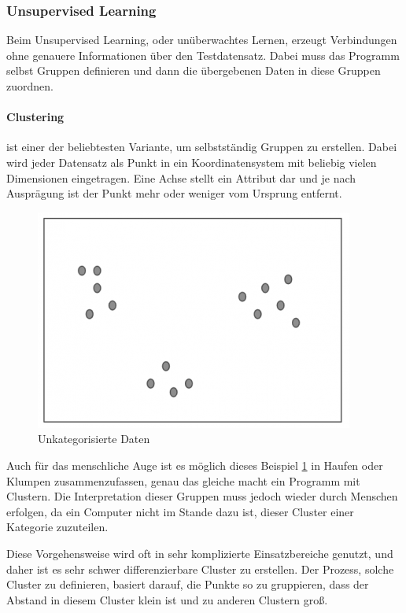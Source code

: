 \subsubsection{Unsupervised Learning}

Beim Unsupervised Learning, oder unüberwachtes Lernen, erzeugt Verbindungen ohne genauere Informationen über den Testdatensatz. Dabei muss das Programm selbst Gruppen definieren und dann die übergebenen Daten in diese Gruppen zuordnen. \cite{SL:online}

\paragraph{Clustering} ist einer der beliebtesten Variante, um selbstständig Gruppen zu erstellen. Dabei wird jeder Datensatz als Punkt in ein Koordinatensystem mit beliebig vielen Dimensionen eingetragen. Eine Achse stellt ein Attribut dar und je nach Ausprägung ist der Punkt mehr oder weniger vom Ursprung entfernt.

\begin{figure}[ht]
    \centering
    \includegraphics[scale=0.8]{sections/machine-learning/images/unclustered-data.png}
    \caption{Unkategorisierte Daten}
    \label{fig:unclustered-data}
\end{figure}

Auch für das menschliche Auge ist es möglich dieses Beispiel \ref{fig:unclustered-data} in Haufen oder Klumpen zusammenzufassen, genau das gleiche macht ein Programm mit Clustern. Die Interpretation dieser Gruppen muss jedoch wieder durch Menschen erfolgen, da ein Computer nicht im Stande dazu ist, dieser Cluster einer Kategorie zuzuteilen.

Diese Vorgehensweise wird oft in sehr komplizierte Einsatzbereiche genutzt, und daher ist es sehr schwer differenzierbare Cluster zu erstellen. Der Prozess, solche Cluster zu definieren, basiert darauf, die Punkte so zu gruppieren, dass der Abstand in diesem Cluster klein ist und zu anderen Clustern groß. 

